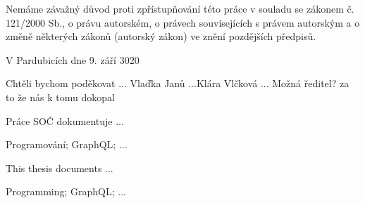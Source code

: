 \noindent Nemáme závažný důvod proti zpřístupňování této práce v souladu se zákonem č. 121/2000 Sb., o právu autorském, o právech souvisejících s právem autorským a o změně některých zákonů (autorský zákon) ve znění pozdějších předpisů. 

\vspace{24 pt}

\noindent V Pardubicích dne 9. září 3020 \dotfill{} 

\hspace{5.75cm} \authorName

\cleardoublepage

\vspace*{0.8\textheight}

\noindent
Chtěli bychom poděkovat ... Vlaďka Janů ...Klára Vlčková ... Možná ředitel? za to že nás k tomu dokopal

\cleardoublepage


\noindent Práce SOČ dokumentuje ...

\vspace{18pt}


\noindent Programování; GraphQL; ...
\vspace{18pt}


\noindent This thesis documents ...

\vspace{18pt}


\noindent Programming; GraphQL; ...

\cleardoublepage

\tableofcontents